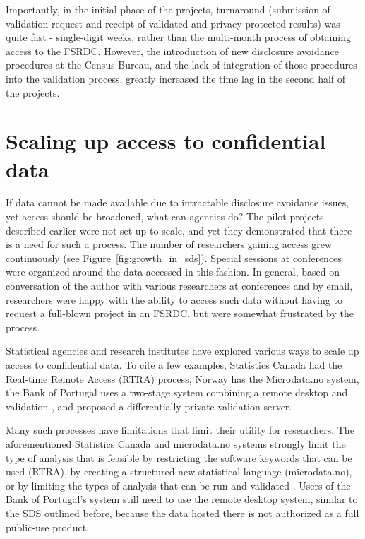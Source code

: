 \documentclass[]{hdsr}
\begin{document}
Importantly, in the initial phase of the projects, turnaround (submission of validation request and receipt of validated and privacy-protected results) was quite fast - single-digit weeks, rather than the multi-month process of obtaining access to the FSRDC. However, the introduction of new disclosure avoidance procedures at the Census Bureau, and the lack of integration of those procedures into the validation process, greatly increased the time lag in the second half of the projects.

\section{Scaling up access to confidential data}

If data cannot be made available due to intractable disclosure avoidance issues, yet access should be broadened, what can agencies do? 
The pilot projects described earlier were not set up to scale, and yet they demonstrated that there is a need for such a process. The number of researchers gaining access grew continuously (see Figure~\ref{fig:growth_in_sds}). Special sessions at conferences were organized around the data accessed in this fashion. In general, based on conversation of the author with various researchers at conferences and by email, researchers were happy with the ability to access such data without having to request a full-blown project in an FSRDC, but were somewhat frustrated by the process. 


Statistical agencies and research institutes have explored various ways to scale up access to confidential data. To cite a few examples, Statistics Canada had the Real-time Remote Access (RTRA) process, Norway has the Microdata.no system, the Bank of Portugal uses a two-stage system combining a remote desktop and validation \citep{guimaraes_reproducibility_2023}, and \citet{barrientos_providing_2018} proposed a differentially private validation server. 

Many such processes have limitations that limit their utility for researchers. The aforementioned Statistics Canada and microdata.no systems strongly limit the type of analysis that is feasible by restricting the software keywords that can be used (RTRA), by creating a structured new statistical language (microdata.no), or by limiting the types of analysis that can be run and validated \citep{barrientos_providing_2018}. Users of the Bank of Portugal's system still need to use the remote desktop system, similar to the SDS outlined before, because the data hosted there is not authorized as a full public-use product.
\end{document}
